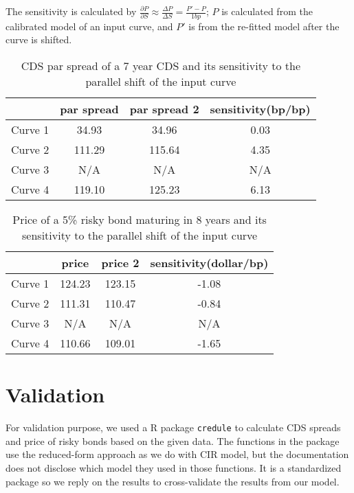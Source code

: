 \documentclass[a4paper,twoside,10pt]{report}
\begin{document}
The sensitivity is calculated by $\frac{\partial P}{\partial S} \approx \frac{\Delta P}{\Delta S} = \frac{P'-P}{1bp}$; $P$ is calculated from the calibrated model of an input curve, and $P'$ is from the re-fitted model after the curve is shifted.

\begin{table}[h!]
\centering
\begin{tabular}{ |c|c|c|c| } 
 \hline
					 & par spread & par spread 2 & sensitivity(bp/bp)\\ 
 \hline
	Curve 1  & 34.93 	&	34.96 &	0.03\\ 
 \hline
  Curve 2  & 111.29  	&	115.64 &  4.35\\ 
 \hline
	Curve 3  & N/A  	&	N/A & N/A\\ 
 \hline
	Curve 4  & 119.10 	&	125.23& 6.13 \\ 
 \hline
\end{tabular}
\caption{CDS par spread of a 7 year CDS and its sensitivity to the parallel shift of the input curve}
\label{7y}
\end{table}

\begin{table}[h!]
\centering
\begin{tabular}{ |c|c|c|c| } 
 \hline
					 & price & price 2 &sensitivity(dollar/bp)\\ 
 \hline
	Curve 1  & 124.23 	&	123.15 & -1.08\\ 
 \hline
  Curve 2  & 111.31  &	110.47& -0.84\\ 
 \hline
	Curve 3  & N/A	& N/A & N/A \\ 
 \hline
	Curve 4  & 110.66 & 109.01	& -1.65\\ 
 \hline
\end{tabular}
\caption{Price of a 5\% risky bond maturing in 8 years and its sensitivity to the parallel shift of the input curve}
\label{risky_bond}
\end{table}

\chapter{Validation}
For validation purpose, we used a R package \texttt{credule} to calculate CDS spreads and price of risky bonds based on the given data. The functions in the package use the reduced-form approach as we do with CIR model, but the documentation does not disclose which model they used in those functions. It is a standardized package so we reply on the results to cross-validate the results from our model.
\end{document}
